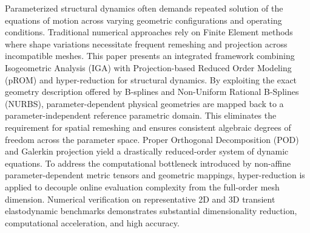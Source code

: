 Parameterized structural dynamics often demands repeated solution of the equations of motion across varying geometric configurations and operating conditions. Traditional numerical approaches rely on Finite Element methods where shape variations necessitate frequent remeshing and projection across incompatible meshes. This paper presents an integrated framework combining Isogeometric Analysis (IGA) with Projection-based Reduced Order Modeling (pROM) and hyper-reduction for structural dynamics. By exploiting the exact geometry description offered by B-splines and Non-Uniform Rational B-Splines (NURBS), parameter-dependent physical geometries are mapped back to a parameter-independent reference parametric domain. This eliminates the requirement for spatial remeshing and ensures consistent algebraic degrees of freedom across the parameter space. Proper Orthogonal Decomposition (POD) and Galerkin projection yield a drastically reduced-order system of dynamic equations. To address the computational bottleneck introduced by non-affine parameter-dependent metric tensors and geometric mappings, hyper-reduction is applied to decouple online evaluation complexity from the full-order mesh dimension. Numerical verification on representative 2D and 3D transient elastodynamic benchmarks demonstrates substantial dimensionality reduction, computational acceleration, and high accuracy.
